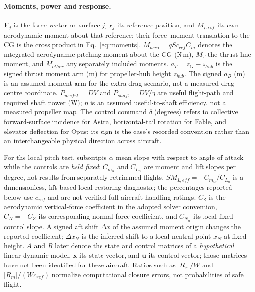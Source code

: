 \documentclass[11pt,a4paper]{article}
\begin{document}
\paragraph{Moments, power and response.} $\boldsymbol F_j$ is the force vector on surface $j$, $\boldsymbol r_j$ its reference position, and $M_{j,ref}$ its own aerodynamic moment about that reference; their force--moment translation to the CG is the cross product in Eq.~\ref{eq:moments}. $M_{aero}=qSc_{ref}C_m$ denotes the integrated aerodynamic pitching moment about the CG (N\,m), $M_T$ the thrust-line moment, and $M_{other}$ any separately included moments. $a_T=z_G-z_{hub}$ is the signed thrust moment arm (m) for propeller-hub height $z_{hub}$. The signed $a_D$ (m) is an assumed moment arm for the extra-drag scenario, not a measured drag-centre coordinate. $P_{useful}=DV$ and $P_{shaft}=DV/\eta$ are useful flight-path and required shaft power (W); $\eta$ is an assumed useful-to-shaft efficiency, not a measured propeller map. The control command $\delta$ (degrees) refers to collective forward-surface incidence for Astra, horizontal-tail rotation for Fable, and elevator deflection for Opus; its sign is the case's recorded convention rather than an interchangeable physical direction across aircraft.

For the local pitch test, subscripts $\alpha$ mean slope with respect to angle of attack while the controls are \emph{held fixed}: $C_{m_\alpha}$ and $C_{L_\alpha}$ are moment and lift slopes per degree, not results from separately retrimmed flights. $SM_{L,eff}=-C_{m_\alpha}/C_{L_\alpha}$ is a dimensionless, lift-based local restoring diagnostic; the percentages reported below use $c_{ref}$ and are not verified full-aircraft handling ratings. $C_Z$ is the aerodynamic vertical-force coefficient in the adopted solver convention, $C_N=-C_Z$ its corresponding normal-force coefficient, and $C_{N_\alpha}$ its local fixed-control slope. A signed aft shift $\Delta x$ of the assumed moment origin changes the reported coefficient; $\Delta x_N$ is the inferred shift to a local neutral point $x_N$ at fixed height. $A$ and $B$ later denote the state and control matrices of a \emph{hypothetical} linear dynamic model, $\boldsymbol x$ its state vector, and $\boldsymbol u$ its control vector; those matrices have not been identified for these aircraft. Ratios such as $|R_x|/W$ and $|R_m|/(Wc_{ref})$ normalize computational closure errors, not probabilities of safe flight.
\end{document}
